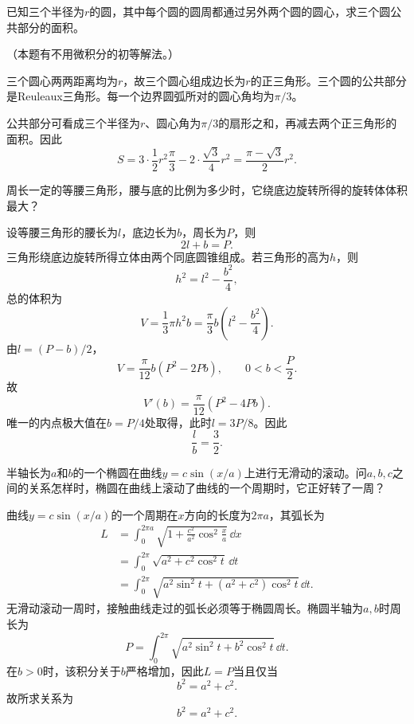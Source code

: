 \begin{xexercise}[3]
已知三个半径为$r$的圆，其中每个圆的圆周都通过另外两个圆的圆心，求三个圆公共部分的面积。

  （本题有不用微积分的初等解法。）
\end{xexercise}
\begin{xsolution}
三个圆心两两距离均为$r$，故三个圆心组成边长为$r$的正三角形。三个圆的公共部分是Reuleaux三角形。每一个边界圆弧所对的圆心角均为$\pi/3$。

公共部分可看成三个半径为$r$、圆心角为$\pi/3$的扇形之和，再减去两个正三角形的面积。因此
\[
 S=3\cdot\frac12r^2\frac\pi3
 -2\cdot\frac{\sqrt3}{4}r^2
 =\frac{\pi-\sqrt3}{2}r^2.
\]
\end{xsolution}


\begin{xexercise}[4]
周长一定的等腰三角形，腰与底的比例为多少时，它绕底边旋转所得的旋转体体积最大？
\end{xexercise}
\begin{xsolution}
设等腰三角形的腰长为$l$，底边长为$b$，周长为$P$，则
\[
 2l+b=P.
\]
三角形绕底边旋转所得立体由两个同底圆锥组成。若三角形的高为$h$，则
\[
 h^2=l^2-\frac{b^2}{4},
\]
总的体积为
\[
 V=\frac13\pi h^2b
 =\frac\pi3b\left(l^2-\frac{b^2}{4}\right).
\]
由$l=(P-b)/2$，
\[
 V=\frac\pi{12}b(P^2-2Pb),\qquad 0<b<\frac P2.
\]
故
\[
 V'(b)=\frac\pi{12}(P^2-4Pb).
\]
唯一的内点极大值在$b=P/4$处取得，此时$l=3P/8$。因此
\[
 \boxed{\frac lb=\frac32}.
\]
\end{xsolution}


\begin{xexercise}[5]
半轴长为$a$和$b$的一个椭圆在曲线$y=c\sin(x/a)$上进行无滑动的滚动。问$a,b,c$之间的关系怎样时，椭圆在曲线上滚动了曲线的一个周期时，它正好转了一周？
\end{xexercise}
\begin{xsolution}
曲线$y=c\sin(x/a)$的一个周期在$x$方向的长度为$2\pi a$，其弧长为
\begin{align*}
L&=\int_0^{2\pi a}\sqrt{1+\frac{c^2}{a^2}\cos^2\frac xa}\,\dd x\\
&=\int_0^{2\pi}\sqrt{a^2+c^2\cos^2 t}\,\dd t\\
&=\int_0^{2\pi}\sqrt{a^2\sin^2 t+(a^2+c^2)\cos^2 t}\,\dd t.
\end{align*}
无滑动滚动一周时，接触曲线走过的弧长必须等于椭圆周长。椭圆半轴为$a,b$时周长为
\[
 P=\int_0^{2\pi}\sqrt{a^2\sin^2 t+b^2\cos^2 t}\,\dd t.
\]
在$b>0$时，该积分关于$b$严格增加，因此$L=P$当且仅当
\[
 b^2=a^2+c^2.
\]
故所求关系为
\[
 \boxed{b^2=a^2+c^2}.
\]
\end{xsolution}


